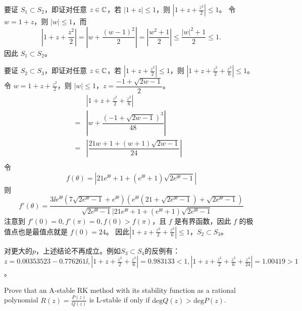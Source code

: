 \documentclass[lang=cn,a4paper,newtx,bibend=bibtex]{elegantpaper}
\begin{document}
\begin{solution}
  要证 $S_1\subset S_2$，即证对任意 $z\in \mathbb{C}$，若 $|1+z|\leq 1$，则 $|1+z+\frac {z^2}2|\leq 1$。
  令 $w=1+z$，则 $|w|\leq 1$，而
  \begin{equation*}
    |1+z+\frac {z^2}2| = |w+\frac{(w-1)^2}2| = |\frac {w^2+1}2| \leq \frac {|w|^2+1}2 \leq 1.
  \end{equation*}
  因此 $S_1\subset S_2$。

  要证 $S_2\subset S_3$，即证对任意 $z\in \mathbb{C}$，若 $|1+z+\frac {z^2}2|\leq 1$，则 $|1+z+\frac {z^2}2+\frac {z^3}6|\leq 1$。
  令 $w=1+z+\frac{z^2}2$，则 $|w|\leq 1$，$z=\dfrac{-1+\sqrt{2w-1}}2$。
  \begin{equation*}
    \begin{aligned}
      & |1+z+\frac {z^2}2+\frac {z^3}6| & \\
      = & |w+\dfrac{(-1+\sqrt{2w-1})^3}{48}| & \\
      = & |\dfrac{21w+1+(w+1)\sqrt{2w-1}}{24}| & \\
    \end{aligned}
  \end{equation*}
  令
  \begin{equation*}
    f(\theta) = |21e^{\ii\theta}+1+(e^{\ii\theta}+1)\sqrt{2e^{\ii\theta}-1}|
  \end{equation*}
  则
  \begin{equation*}
    f'(\theta) = \dfrac{3\ii e^{\ii\theta}(7\sqrt{2e^{\ii\theta}-1}+e^{\ii\theta})
    (e^{\ii\theta}(21+\sqrt{2e^{\ii\theta}-1})+\sqrt{2e^{\ii\theta}-1})}
    {\sqrt{2e^{\ii\theta}-1}|21e^{\ii\theta}+1+(e^{\ii\theta}+1)\sqrt{2e^{\ii\theta}-1}}
  \end{equation*}
  注意到 $f'(0)=0, f'(\pi)=0, f(0)>f(\pi)$，且 $f$ 是有界函数，因此 $f$ 的极值点也是最值点就是 $f(0)=24$。
  因此$|1+z+\frac {z^2}2+\frac {z^3}6|\leq 1$，$S_2\subset S_3$。

  对更大的$p$，上述结论不再成立。例如$S_3\subset S_4$的反例有：
  $z=0.00353523-0.776261\ii,|1+z+\frac{z^2}2+\frac{z^3}6|=0.983133<1,|1+z+\frac{z^2}2+\frac{z^3}6+\frac{z^4}{24}|=1.00419>1$。
\end{solution}

\begin{prob}[Exercise 10.212]
  Prove that an A-stable RK method with its stability function
  as a rational polynomial $R(z) = \frac {P(z)}{Q(z)}$ is L-stable if only if $\mathrm{deg} Q(z) > \mathrm{deg} P(z)$.
\end{prob}
\end{document}
